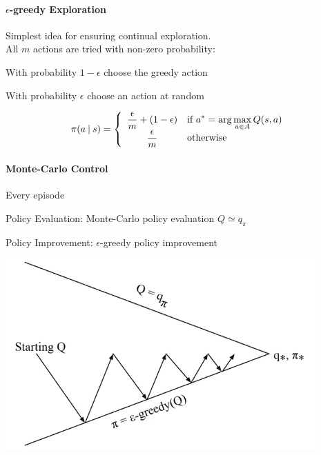 \documentclass[10pt]{report}
\begin{document}
\paragraph{$\epsilon$-greedy Exploration} Simplest idea for ensuring continual exploration.\\
All $m$ actions are tried with non-zero probability:\begin{list}{}{}
	\item With probability $1-\epsilon$ choose the greedy action
	\item With probability $\epsilon$ choose an action at random
\end{list}
$$\pi(a\:|\:s)= \left\{\begin{array}{c l}
\displaystyle \frac{\epsilon}{m}+(1-\epsilon)&\displaystyle \text{if }a^*=\arg\max_{a\in A}Q(s,a)\\
\displaystyle \frac{\epsilon}{m}&\text{otherwise}
\end{array}\right.$$
\paragraph{Monte-Carlo Control} Every episode
\begin{list}{}{}
	\item Policy Evaluation: Monte-Carlo policy evaluation $Q\simeq q_\pi$
	\item Policy Improvement: $\epsilon$-greedy policy improvement
\end{list}
\begin{center}
	\includegraphics[scale=0.5]{172.png}
\end{center}
\end{document}
